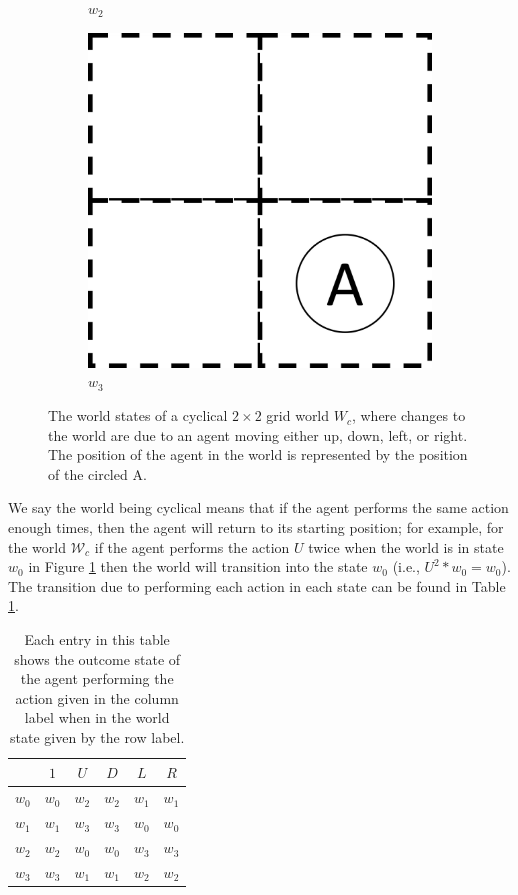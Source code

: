 \begin{figure}
\begin{subfigure}[b]{0.45\linewidth}
        \caption{$w_{2}$}
    \end{subfigure}
    \begin{subfigure}[b]{0.45\linewidth}
        \centering
        \includegraphics[width=0.5\linewidth]{2MathematicalFramework/InitialFramework/Images/2x2_no_walls_world_states/w3.png}
        \caption{$w_{3}$}
    \end{subfigure}
    \caption{The world states of a cyclical $2\times 2$ grid world $W_{c}$, where changes to the world are due to an agent moving either up, down, left, or right. The position of the agent in the world is represented by the position of the circled A.}
    \label{fig:2x2-cyclical-grid-world-states}
\end{figure}

We say the world being cyclical means that if the agent performs the same action enough times, then the agent will return to its starting position; for example, for the world $\mathscr{W}_{c}$ if the agent performs the action $U$ twice when the world is in state $w_{0}$ in Figure \ref{fig:2x2-cyclical-grid-world-states} then the world will transition into the state $w_{0}$ (i.e., $U^2 * w_{0} = w_0$).
The transition due to performing each action in each state can be found in Table \ref{tab:2x2-gridworld-minimum-transitions}.

\begin{table}
    \centering
    \begin{tabular}{c|c c c c c}
                &  $1$      & $U$       & $D$       & $L$       & $R$\\
         \hline
        $w_{0}$ & $w_{0}$   & $w_{2}$   & $w_{2}$   & $w_{1}$   & $w_{1}$\\
        $w_{1}$ & $w_{1}$   & $w_{3}$   & $w_{3}$   & $w_{0}$   & $w_{0}$\\
        $w_{2}$ & $w_{2}$   & $w_{0}$   & $w_{0}$   & $w_{3}$   & $w_{3}$\\
        $w_{3}$ & $w_{3}$   & $w_{1}$   & $w_{1}$   & $w_{2}$   & $w_{2}$\\
    \end{tabular}
    \caption{Each entry in this table shows the outcome state of the agent performing the action given in the column label when in the world state given by the row label.}
    \label{tab:2x2-gridworld-minimum-transitions}
\end{table}

